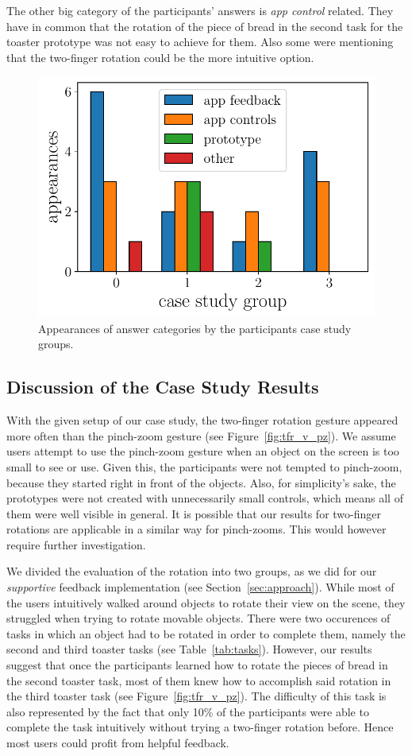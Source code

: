 \documentclass[manuscript]{acmart}
\begin{document}
			The other big category of the participants' answers is \emph{app control} related. They have in common that the rotation of the piece of bread in the second task for the toaster prototype was not easy to achieve for them. Also some were mentioning that the two-finger rotation could be the more intuitive option.

			\begin{figure}[H]
				\centering
				\includegraphics[width=.49\textwidth]{img/plot/plot_tags_implementations.pdf}
				\caption{Appearances of answer categories by the participants case study groups.}
				\label{fig:tags_imp}
			\end{figure}

		\subsection{Discussion of the Case Study Results}\label{ssec:discussion}
			With the given setup of our case study, the two-finger rotation gesture appeared more often than the pinch-zoom gesture (see Figure~\ref{fig:tfr_v_pz}). We assume users attempt to use the pinch-zoom gesture when an object on the screen is too small to see or use. Given this, the participants were not tempted to pinch-zoom, because they started right in front of the objects. Also, for simplicity's sake, the prototypes were not created with unnecessarily small controls, which means all of them were well visible in general. It is possible that our results for two-finger rotations are applicable in a similar way for pinch-zooms. This would however require further investigation.

			We divided the evaluation of the rotation into two groups, as we did for our \emph{supportive} feedback implementation (see Section~\ref{sec:approach}). While most of the users intuitively walked around objects to rotate their view on the scene, they struggled when trying to rotate movable objects. There were two occurences of tasks in which an object had to be rotated in order to complete them, namely the second and third toaster tasks (see Table~\ref{tab:tasks}). However, our results suggest that once the participants learned how to rotate the pieces of bread in the second toaster task, most of them knew how to accomplish said rotation in the third toaster task (see Figure~\ref{fig:tfr_v_pz}). The difficulty of this task is also represented by the fact that only 10\% of the participants were able to complete the task intuitively without trying a two-finger rotation before. Hence most users could profit from helpful feedback.
\end{document}
